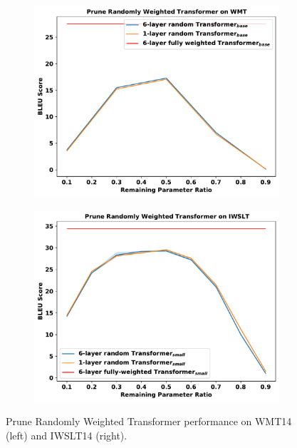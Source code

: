 \begin{figure}
    \centering
    \begin{subfigure}{.4\textwidth}
        \centering
        \includegraphics[width=\textwidth]{fig/wmt_result.pdf}
    \end{subfigure}%
    \begin{subfigure}{.4\textwidth}
        \centering
        \includegraphics[width=\textwidth]{fig/iwslt_base.pdf}
    \end{subfigure}
            \vspace{-5pt}
    \caption{Prune Randomly Weighted Transformer performance on WMT14 (left) and IWSLT14 (right).}
    \label{fig:mt_base}
            \vspace{-5pt}
\end{figure}

